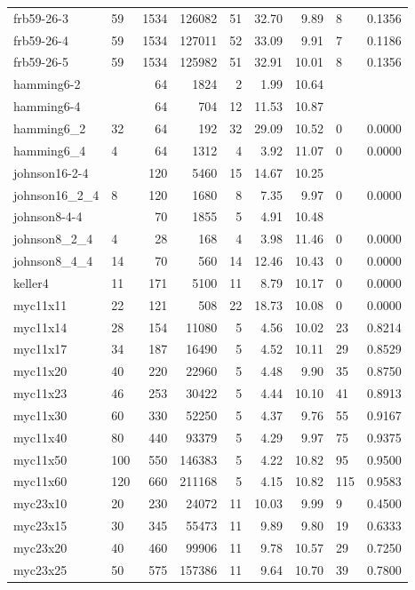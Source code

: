\begin{longtable}{llrrrrrll}
frb59-26-3 & 59 & 1534 & 126082 & 51 & 32.70 & 9.89 & 8 & 0.1356 \\
frb59-26-4 & 59 & 1534 & 127011 & 52 & 33.09 & 9.91 & 7 & 0.1186 \\
frb59-26-5 & 59 & 1534 & 125982 & 51 & 32.91 & 10.01 & 8 & 0.1356 \\
hamming6-2 &  & 64 & 1824 & 2 & 1.99 & 10.64 &  &  \\
hamming6-4 &  & 64 & 704 & 12 & 11.53 & 10.87 &  &  \\
hamming6\_2 & 32 & 64 & 192 & 32 & 29.09 & 10.52 & 0 & 0.0000 \\
hamming6\_4 & 4 & 64 & 1312 & 4 & 3.92 & 11.07 & 0 & 0.0000 \\
johnson16-2-4 &  & 120 & 5460 & 15 & 14.67 & 10.25 &  &  \\
johnson16\_2\_4 & 8 & 120 & 1680 & 8 & 7.35 & 9.97 & 0 & 0.0000 \\
johnson8-4-4 &  & 70 & 1855 & 5 & 4.91 & 10.48 &  &  \\
johnson8\_2\_4 & 4 & 28 & 168 & 4 & 3.98 & 11.46 & 0 & 0.0000 \\
johnson8\_4\_4 & 14 & 70 & 560 & 14 & 12.46 & 10.43 & 0 & 0.0000 \\
keller4 & 11 & 171 & 5100 & 11 & 8.79 & 10.17 & 0 & 0.0000 \\
myc11x11 & 22 & 121 & 508 & 22 & 18.73 & 10.08 & 0 & 0.0000 \\
myc11x14 & 28 & 154 & 11080 & 5 & 4.56 & 10.02 & 23 & 0.8214 \\
myc11x17 & 34 & 187 & 16490 & 5 & 4.52 & 10.11 & 29 & 0.8529 \\
myc11x20 & 40 & 220 & 22960 & 5 & 4.48 & 9.90 & 35 & 0.8750 \\
myc11x23 & 46 & 253 & 30422 & 5 & 4.44 & 10.10 & 41 & 0.8913 \\
myc11x30 & 60 & 330 & 52250 & 5 & 4.37 & 9.76 & 55 & 0.9167 \\
myc11x40 & 80 & 440 & 93379 & 5 & 4.29 & 9.97 & 75 & 0.9375 \\
myc11x50 & 100 & 550 & 146383 & 5 & 4.22 & 10.82 & 95 & 0.9500 \\
myc11x60 & 120 & 660 & 211168 & 5 & 4.15 & 10.82 & 115 & 0.9583 \\
myc23x10 & 20 & 230 & 24072 & 11 & 10.03 & 9.99 & 9 & 0.4500 \\
myc23x15 & 30 & 345 & 55473 & 11 & 9.89 & 9.80 & 19 & 0.6333 \\
myc23x20 & 40 & 460 & 99906 & 11 & 9.78 & 10.57 & 29 & 0.7250 \\
myc23x25 & 50 & 575 & 157386 & 11 & 9.64 & 10.70 & 39 & 0.7800 \\

\end{longtable}
